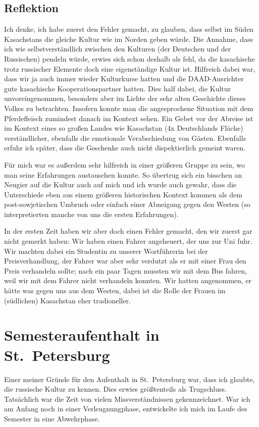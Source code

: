 \documentclass[12pt,headsepline,a4paper]{scrartcl}
\begin{document}
\subsection*{Reflektion}

Ich denke, ich habe zuerst den Fehler gemacht, zu glauben, dass selbst im Süden Kasachstans die gleiche Kultur wie im Norden geben würde. 
Die Annahme, dass ich wie selbstverständlich zwischen den Kulturen (der Deutschen und der Russischen) pendeln würde, erwies sich schon deshalb als fehl, da die kasachische trotz russischer Elemente doch eine eigenständige Kultur ist. 
Hilfreich dabei war, dass wir ja auch immer wieder Kulturkurse hatten und die DAAD-Ausrichter gute kasachische Kooperationspartner hatten. Dies half dabei, die Kultur unvoreingenommen, besonders aber im Lichte der sehr alten Geschichte dieses Volkes zu betrachten. Insofern konnte man die angesprochene Situation mit dem Pferdefleisch zumindest danach im Kontext sehen. 
Ein Gebet vor der Abreise ist im Kontext eines so großen Landes wie Kasachstan (4x Deutschlands Fläche) verständlicher, ebenfalls die emotionale Verabschiedung von Gästen. 
Ebenfalls erfuhr ich später, dass die Geschenke auch nicht dispektierlich gemeint waren.

Für mich war es außerdem sehr hilfreich in einer größeren Gruppe zu sein, wo man seine Erfahrungen austauschen konnte. 
So übertrug sich ein bisschen an Neugier auf die Kultur auch auf mich und ich wurde auch gewahr, dass die Unterschiede eben aus einem größeren historischen Kontext kommen als dem post-sowjetischen Umbruch oder einfach einer Abneigung gegen den Westen (so interpretierten manche von uns die ersten Erfahrungen).

In der ersten Zeit haben wir aber doch einen Fehler gemacht, den wir zuerst gar nicht gemerkt haben: 
Wir haben einen Fahrer angeheuert, der uns zur Uni fuhr. 
Wir machten dabei ein Studentin zu unserer Wortführerin bei der Preisverhandlung, der Fahrer war aber sehr verdutzt als er mit einer Frau den Preis verhandeln sollte; 
nach ein paar Tagen mussten wir mit dem Bus fahren, weil wir mit dem Fahrer nicht verhandeln konnten. 
Wir hatten angenommen, er hätte was gegen uns aus dem Westen, dabei ist die Rolle der Frauen im (südlichen) Kasachstan eher tradioneller.

\section{Semesteraufenthalt in St.\ Petersburg}
Einer meiner Gründe für den Aufenthalt in St.\ Petersburg war, dass ich glaubte, die russische Kultur zu kennen. Dies erwies größtenteils als Trugschluss. Tatsächlich war die Zeit von vielen Missverständnissen gekennzeichnet. War ich am Anfang noch in einer Verleugnungphase, entwickelte ich mich im Laufe des Semester in eine Abwehrphase.
\end{document}
